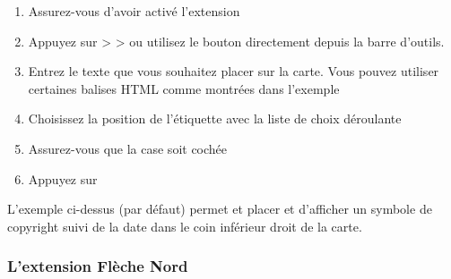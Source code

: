 \begin{enumerate}
\item Assurez-vous d'avoir activé l'extension
\item Appuyez sur  >  >  ou utilisez le bouton  directement depuis la barre d'outils.
\item Entrez le texte que vous souhaitez placer sur la carte. Vous pouvez
  utiliser certaines balises HTML comme montrées dans l'exemple
\item Choisissez la position de l'étiquette avec la liste de choix déroulante 
\item Assurez-vous que la case  soit cochée
\item Appuyez sur  
\end{enumerate}

L'exemple ci-dessus (par défaut) permet et placer et d'afficher un symbole de
copyright suivi de la date dans le coin inférieur droit de la carte.

\subsubsection{L'extension Flèche Nord}

